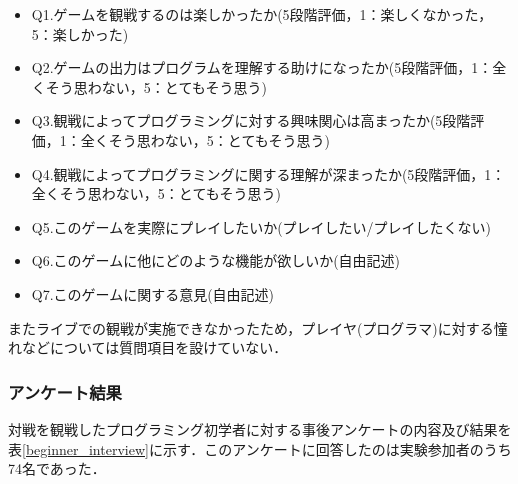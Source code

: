 \begin{itemize}
  \item Q1.ゲームを観戦するのは楽しかったか(5段階評価，1：楽しくなかった，5：楽しかった)
  \item Q2.ゲームの出力はプログラムを理解する助けになったか(5段階評価，1：全くそう思わない，5：とてもそう思う)
  \item Q3.観戦によってプログラミングに対する興味関心は高まったか(5段階評価，1：全くそう思わない，5：とてもそう思う)
  \item Q4.観戦によってプログラミングに関する理解が深まったか(5段階評価，1：全くそう思わない，5：とてもそう思う)
  \item Q5.このゲームを実際にプレイしたいか(プレイしたい/プレイしたくない)
  \item Q6.このゲームに他にどのような機能が欲しいか(自由記述)
  \item Q7.このゲームに関する意見(自由記述)
\end{itemize}

またライブでの観戦が実施できなかったため，プレイヤ(プログラマ)に対する憧れなどについては質問項目を設けていない．

\subsubsection{アンケート結果}

対戦を観戦したプログラミング初学者に対する事後アンケートの内容及び結果を表\ref{beginner_interview}に示す．このアンケートに回答したのは実験参加者のうち74名であった．

